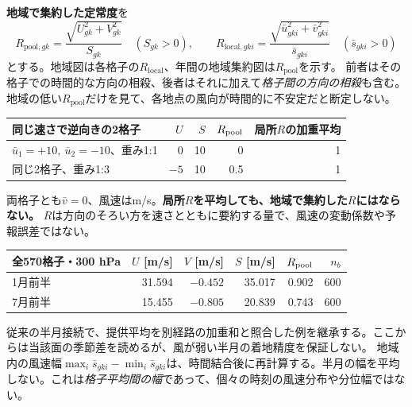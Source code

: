 \documentclass[11pt,a4paper]{article}
\begin{document}
\textbf{地域で集約した定常度}を
\begin{equation}
 R_{\mathrm{pool},gk}=\frac{\sqrt{U_{gk}^2+V_{gk}^2}}{S_{gk}}
 \quad(S_{gk}>0),\qquad
 R_{\mathrm{local},gki}=\frac{\sqrt{\bar u_{gki}^2+\bar v_{gki}^2}}{\bar s_{gki}}
 \quad(\bar s_{gki}>0)
 \label{eq:climate-constancy}
\end{equation}
とする。地域図は各格子の$R_{\mathrm{local}}$、年間の地域集約図は$R_{\mathrm{pool}}$を示す。
前者はその格子での時間的な方向の相殺、後者はそれに加えて\emph{格子間の方向の相殺}も含む。
地域の低い$R_{\mathrm{pool}}$だけを見て、各地点の風向が時間的に不安定だと断定しない。

\begin{center}\small
\begin{tabular}{@{}p{49mm}rrrr@{}}
\toprule 同じ速さで逆向きの2格子 & $U$ & $S$ & $R_{\rm pool}$ & 局所$R$の加重平均 \\\midrule
$\bar u_1=+10,\ \bar u_2=-10$、重み1:1 & 0 & 10 & 0 & 1 \\
同じ2格子、重み1:3 & $-5$ & 10 & 0.5 & 1 \\\bottomrule
\end{tabular}
\end{center}
両格子とも$\bar v=0$、風速はm/s。\textbf{局所$R$を平均しても、地域で集約した$R$にはならない。}
$R$は方向のそろい方を速さとともに要約する量で、風速の変動係数や予報誤差ではない。

\begin{center}\small
\begin{tabular}{@{}lrrrrr@{}}
\toprule 全570格子・300 hPa & $U$ [m/s] & $V$ [m/s] & $S$ [m/s] & $R_{\rm pool}$ & $n_b$ \\\midrule
1月前半 & 31.594 & $-0.452$ & 35.017 & 0.902 & 600 \\
7月前半 & 15.455 & $-0.805$ & 20.839 & 0.743 & 600 \\\bottomrule
\end{tabular}
\end{center}
従来の半月接続で、提供平均を別経路の加重和と照合した例を継承する。ここからは当該面の季節差を読めるが、風が弱い半月の着地精度を保証しない。
地域内の風速幅$\max_i\bar s_{gki}-\min_i\bar s_{gki}$は、時間結合後に再計算する。半月の幅を平均しない。これは\emph{格子平均間の幅}であって、個々の時刻の風速分布や分位幅ではない。

\clearpage
\end{document}
